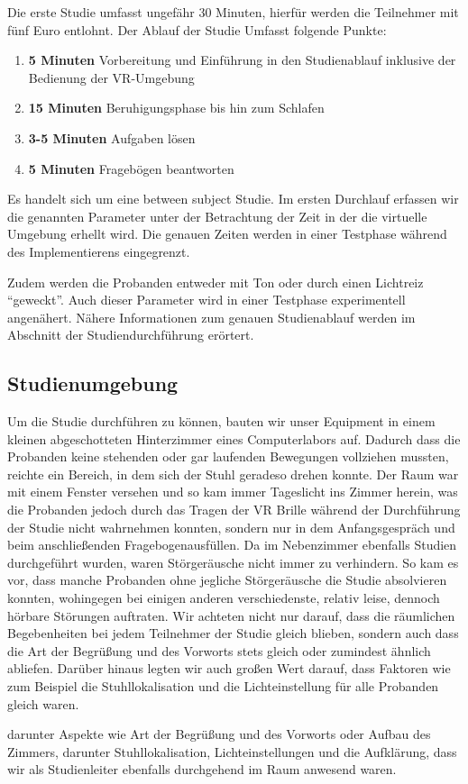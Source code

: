 Die erste Studie umfasst ungefähr 30 Minuten, hierfür werden die Teilnehmer mit fünf Euro entlohnt. Der Ablauf der Studie Umfasst folgende Punkte:

\begin{enumerate}
	\item \textbf{5 Minuten} Vorbereitung und Einführung in den Studienablauf inklusive der Bedienung der VR-Umgebung
	\item \textbf{15 Minuten} Beruhigungsphase bis hin zum Schlafen
	\item \textbf{3-5 Minuten} Aufgaben lösen
	\item \textbf{5 Minuten} Fragebögen beantworten
\end{enumerate}

Es handelt sich um eine between subject Studie. Im ersten Durchlauf erfassen wir die genannten Parameter unter der Betrachtung der Zeit in der die virtuelle Umgebung erhellt wird. Die genauen Zeiten werden in einer Testphase während des Implementierens eingegrenzt.

Zudem werden die Probanden entweder mit Ton oder durch einen Lichtreiz "`geweckt"'. Auch dieser Parameter wird in einer Testphase experimentell angenähert. Nähere Informationen zum genauen Studienablauf werden im Abschnitt der Studiendurchführung erörtert.

\subsection{Studienumgebung}

Um die Studie durchführen zu können, bauten wir unser Equipment in einem kleinen abgeschotteten Hinterzimmer eines Computerlabors auf. Dadurch dass die Probanden keine stehenden oder gar laufenden Bewegungen vollziehen mussten, reichte ein Bereich, in dem sich der Stuhl geradeso drehen konnte. Der Raum war mit einem Fenster versehen und so kam immer Tageslicht ins Zimmer herein, was die Probanden jedoch durch das Tragen der VR Brille während der Durchführung der Studie nicht wahrnehmen konnten, sondern nur in dem Anfangsgespräch und beim anschließenden Fragebogenausfüllen. Da im Nebenzimmer ebenfalls Studien durchgeführt wurden, waren Störgeräusche nicht immer zu verhindern. So kam es vor, dass manche Probanden ohne jegliche Störgeräusche die Studie absolvieren konnten, wohingegen bei einigen anderen verschiedenste, relativ leise, dennoch hörbare Störungen auftraten. Wir achteten nicht nur darauf, dass die räumlichen Begebenheiten bei jedem Teilnehmer der Studie gleich blieben, sondern auch dass die Art der Begrüßung und des Vorworts stets gleich oder zumindest ähnlich abliefen. Darüber hinaus legten wir auch großen Wert darauf, dass Faktoren wie zum Beispiel die Stuhllokalisation und die Lichteinstellung für alle Probanden gleich waren.

 darunter Aspekte wie Art der Begrüßung und des Vorworts oder Aufbau des Zimmers, darunter Stuhllokalisation, Lichteinstellungen und die Aufklärung, dass wir als Studienleiter ebenfalls durchgehend im Raum anwesend waren. 
